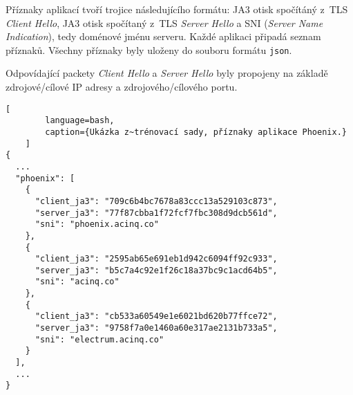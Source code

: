 Příznaky aplikací tvoří trojice následujícího formátu: JA3 otisk spočítáný z~TLS \textit{Client Hello}, JA3 otisk spočítaný z~TLS \textit{Server Hello} a SNI (\textit{Server Name Indication}), tedy doménové jménu serveru. Každé aplikaci připadá seznam příznaků. Všechny příznaky byly uloženy do souboru formátu \texttt{json}.

Odpovídající packety \textit{Client Hello} a \textit{Server Hello} byly propojeny na základě zdrojové/cílové IP adresy a zdrojového/cílového portu.

\begin{center}
    \begin{lstlisting}[
        language=bash,
        caption={Ukázka z~trénovací sady, příznaky aplikace Phoenix.}
    ]
{
  ...
  "phoenix": [
    {
      "client_ja3": "709c6b4bc7678a83ccc13a529103c873",
      "server_ja3": "77f87cbba1f72fcf7fbc308d9dcb561d",
      "sni": "phoenix.acinq.co"
    },
    {
      "client_ja3": "2595ab65e691eb1d942c6094ff92c933",
      "server_ja3": "b5c7a4c92e1f26c18a37bc9c1acd64b5",
      "sni": "acinq.co"
    },
    {
      "client_ja3": "cb533a60549e1e6021bd620b77ffce72",
      "server_ja3": "9758f7a0e1460a60e317ae2131b733a5",
      "sni": "electrum.acinq.co"
    }
  ],
  ...
}
\end{lstlisting}
\end{center}

